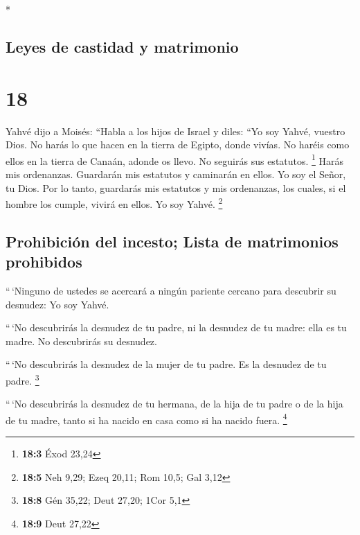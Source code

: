 \begin{paracol}{2}
\begin{otherlanguage}{english}
\end{otherlanguage}

\switchcolumn[0]*

\hypertarget{leyes-de-castidad-y-matrimonio}{%
\subsection{Leyes de castidad y
matrimonio}\label{leyes-de-castidad-y-matrimonio}}

\hypertarget{section-34}{%
\section{18}\label{section-34}}

 Yahvé dijo a Moisés:  ``Habla a los hijos
de Israel y diles: ``Yo soy Yahvé, vuestro Dios.  No harás
lo que hacen en la tierra de Egipto, donde vivías. No haréis como ellos
en la tierra de Canaán, adonde os llevo. No seguirás sus estatutos.
\footnote{\textbf{18:3} Éxod 23,24}  Harás mis ordenanzas.
Guardarán mis estatutos y caminarán en ellos. Yo soy el Señor, tu Dios.
 Por lo tanto, guardarás mis estatutos y mis ordenanzas,
los cuales, si el hombre los cumple, vivirá en ellos. Yo soy Yahvé.
\footnote{\textbf{18:5} Neh 9,29; Ezeq 20,11; Rom 10,5; Gal 3,12}

\hypertarget{prohibiciuxf3n-del-incesto-lista-de-matrimonios-prohibidos}{%
\subsection{Prohibición del incesto; Lista de matrimonios
prohibidos}\label{prohibiciuxf3n-del-incesto-lista-de-matrimonios-prohibidos}}

 ``\,`Ninguno de ustedes se acercará a ningún pariente
cercano para descubrir su desnudez: Yo soy Yahvé.

 ``\,`No descubrirás la desnudez de tu padre, ni la
desnudez de tu madre: ella es tu madre. No descubrirás su desnudez.

 ``\,`No descubrirás la desnudez de la mujer de tu padre.
Es la desnudez de tu padre. \footnote{\textbf{18:8} Gén 35,22; Deut
  27,20; 1Cor 5,1}

 ``\,`No descubrirás la desnudez de tu hermana, de la hija
de tu padre o de la hija de tu madre, tanto si ha nacido en casa como si
ha nacido fuera. \footnote{\textbf{18:9} Deut 27,22}


\end{paracol}
